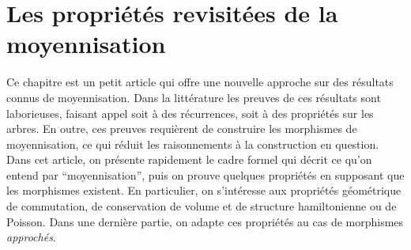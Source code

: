 
\clearemptydoublepage
\chapter{Les propriétés revisitées de la moyennisation}
\label{chap:avg}

Ce chapitre est un petit article qui offre une nouvelle approche sur des
résultats connus de moyennisation. Dans la littérature les preuves de
ces résultats sont laborieuses, faisant appel soit à des récurrences,
soit à des propriétés sur les arbres. En outre, ces preuves requièrent
de construire les morphismes de moyennisation, ce qui réduit les
raisonnements à la construction en question. Dans cet article, on
présente rapidement le cadre formel qui décrit ce qu'on entend par
\enquote{moyennisation}, puis on prouve quelques propriétés en supposant
que les morphismes existent. En particulier, on s'intéresse aux
propriétés géométrique de commutation, de conservation de volume et de
structure hamiltonienne ou de Poisson. Dans une dernière partie, on
adapte ces propriétés au cas de morphismes \textit{approchés}. 















